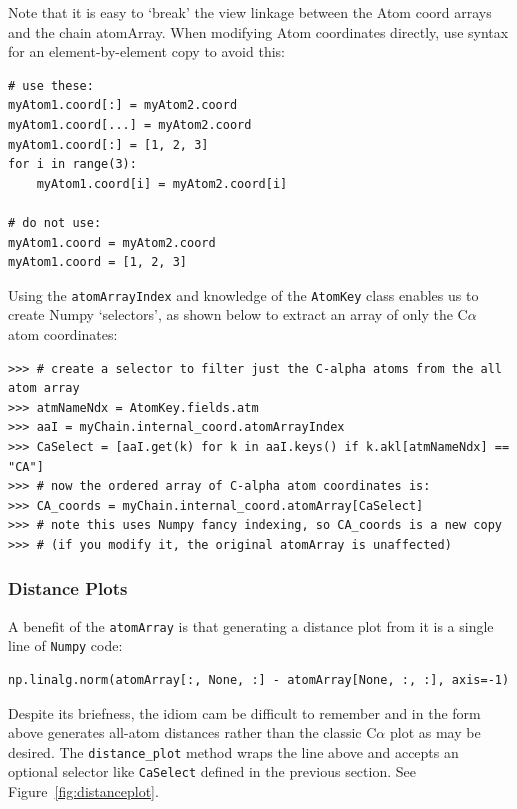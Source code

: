 Note that it is easy to `break' the view linkage between the Atom coord arrays and the
chain atomArray.  When modifying Atom coordinates directly, use syntax for an
element-by-element copy to avoid this:

\begin{verbatim}
# use these:
myAtom1.coord[:] = myAtom2.coord
myAtom1.coord[...] = myAtom2.coord
myAtom1.coord[:] = [1, 2, 3]
for i in range(3):
    myAtom1.coord[i] = myAtom2.coord[i]

# do not use:
myAtom1.coord = myAtom2.coord
myAtom1.coord = [1, 2, 3]
\end{verbatim}


Using the \texttt{atomArrayIndex} and knowledge of the \texttt{AtomKey} class
enables us to create Numpy `selectors', as shown below to extract an array of
only the C$\alpha$ atom coordinates:

\begin{verbatim}
>>> # create a selector to filter just the C-alpha atoms from the all atom array
>>> atmNameNdx = AtomKey.fields.atm
>>> aaI = myChain.internal_coord.atomArrayIndex
>>> CaSelect = [aaI.get(k) for k in aaI.keys() if k.akl[atmNameNdx] == "CA"]
>>> # now the ordered array of C-alpha atom coordinates is:
>>> CA_coords = myChain.internal_coord.atomArray[CaSelect]
>>> # note this uses Numpy fancy indexing, so CA_coords is a new copy
>>> # (if you modify it, the original atomArray is unaffected)
\end{verbatim}

\subsubsection{Distance Plots}

A benefit of the \texttt{atomArray} is that generating a distance plot from it
is a single line of \texttt{Numpy} code:

\begin{verbatim}
np.linalg.norm(atomArray[:, None, :] - atomArray[None, :, :], axis=-1)
\end{verbatim}

Despite its briefness, the idiom cam be difficult to remember and in the form
above generates all-atom distances rather than the classic C$\alpha$ plot
as may be desired.  The \texttt{distance\_plot\(\)} method wraps the line above
and accepts an optional selector like \texttt{CaSelect} defined in the previous
section.  See Figure~\ref{fig:distanceplot}.

